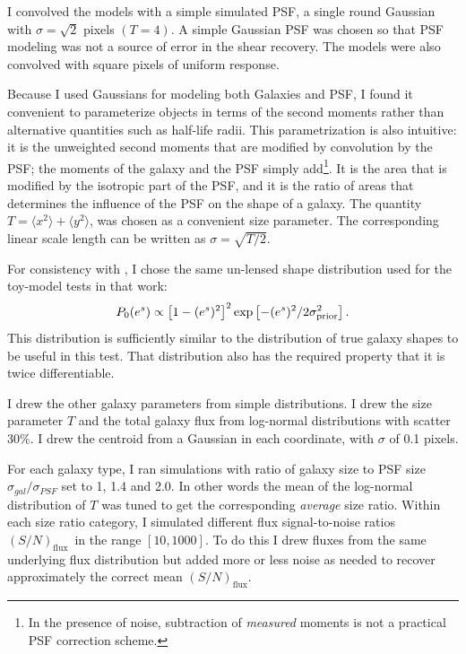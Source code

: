 \documentclass[12pt,preprint]{aastex}
\newcommand{\fsn}{$(S/N)_{\textrm{flux}}$}
\begin{document}
I convolved the models with a simple simulated PSF, a single round Gaussian
with $\sigma = \sqrt{2}$ pixels $(T=4)$.  A simple Gaussian PSF was chosen so
that PSF modeling was not a source of error in the shear recovery.  The models
were also convolved with square pixels of uniform response.

Because I used Gaussians for modeling both Galaxies and PSF, I found it
convenient to parameterize objects in terms of the second moments rather than
alternative quantities such as half-life radii.  This parametrization is also
intuitive: it is the unweighted second moments that are modified by convolution
by the PSF; the moments of the galaxy and the PSF simply add\footnote{In the
presence of noise, subtraction of {\it measured} moments is not a practical PSF
correction scheme.}.  It is the area that is modified by the isotropic part of
the PSF, and it is the ratio of areas that determines the influence of the PSF
on the shape of a galaxy.  The quantity $T = \langle x^2 \rangle + \langle y^2
\rangle$, was chosen as a convenient size parameter.  The corresponding linear
scale length can be written as $\sigma = \sqrt{T/2}$.

For consistency with \cite{ba14}, I chose the same un-lensed shape distribution
used for the toy-model tests in that work: 
\begin{equation}
P_0(e^s)\propto \left[1-(e^s)^2\right]^2 \exp\left[-(e^s)^2/2\sigma_{\rm prior}^2\right].
\end{equation}
This distribution is sufficiently similar to the
distribution of true galaxy shapes to be useful in this test.  That
distribution also has the required property that it is twice differentiable.

I drew the other galaxy parameters from simple distributions.  I drew the size
parameter $T$ and the total galaxy flux from log-normal distributions with
scatter 30\%.  I drew the centroid from a Gaussian in each coordinate, with
$\sigma$ of 0.1 pixels.

For each galaxy type, I ran simulations with ratio of galaxy size to PSF size
$\sigma_{gal}/\sigma_{PSF}$ set to 1, 1.4 and 2.0.  In other words the mean of
the log-normal distribution of $T$ was tuned to get the corresponding {\it
average} size ratio.  Within each size ratio category, I simulated different
flux signal-to-noise ratios \fsn\ in the range $[10,1000]$.  To do this I drew
fluxes from the same underlying flux distribution but added more or less noise
as needed to recover approximately the correct mean \fsn.
\end{document}
